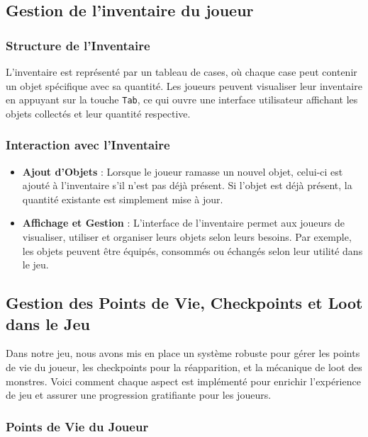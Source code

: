\subsection{Gestion de l'inventaire du joueur }

\subsubsection{Structure de l'Inventaire}

L'inventaire est représenté par un tableau de cases, où chaque case peut contenir un objet spécifique avec sa quantité.
Les joueurs peuvent visualiser leur inventaire en appuyant sur la touche \texttt{Tab}, ce qui ouvre une interface utilisateur affichant
les objets collectés et leur quantité respective.

\subsubsection{Interaction avec l'Inventaire}

\begin{itemize}
      \item \textbf{Ajout d'Objets} : Lorsque le joueur ramasse un nouvel objet, celui-ci est ajouté à l'inventaire s'il n'est pas déjà présent.
            Si l'objet est déjà présent, la quantité existante est simplement mise à jour.
            \\
      \item \textbf{Affichage et Gestion} : L'interface de l'inventaire permet aux joueurs de visualiser, utiliser et organiser leurs objets selon
            leurs besoins. Par exemple, les objets peuvent être équipés, consommés ou échangés selon leur utilité dans le jeu.
\end{itemize}

\subsection{Gestion des Points de Vie, Checkpoints et Loot dans le Jeu}

Dans notre jeu, nous avons mis en place un système robuste pour gérer les points de vie du joueur, les checkpoints pour la réapparition, et la mécanique de loot des monstres. Voici comment chaque aspect est implémenté pour enrichir l'expérience de jeu et assurer une progression gratifiante pour les joueurs.

\subsubsection{Points de Vie du Joueur}

